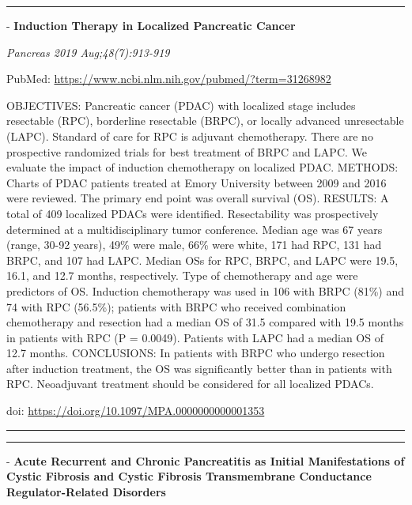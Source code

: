\documentclass[]{article}
\begin{document}
\begin{center}\rule{0.5\linewidth}{\linethickness}\end{center}

 - \textbf{Induction Therapy in Localized Pancreatic Cancer}

\emph{Pancreas 2019 Aug;48(7):913-919}

PubMed: \url{https://www.ncbi.nlm.nih.gov/pubmed/?term=31268982}

OBJECTIVES: Pancreatic cancer (PDAC) with localized stage includes
resectable (RPC), borderline resectable (BRPC), or locally advanced
unresectable (LAPC). Standard of care for RPC is adjuvant chemotherapy.
There are no prospective randomized trials for best treatment of BRPC
and LAPC. We evaluate the impact of induction chemotherapy on localized
PDAC. METHODS: Charts of PDAC patients treated at Emory University
between 2009 and 2016 were reviewed. The primary end point was overall
survival (OS). RESULTS: A total of 409 localized PDACs were identified.
Resectability was prospectively determined at a multidisciplinary tumor
conference. Median age was 67 years (range, 30-92 years), 49\% were
male, 66\% were white, 171 had RPC, 131 had BRPC, and 107 had LAPC.
Median OSs for RPC, BRPC, and LAPC were 19.5, 16.1, and 12.7 months,
respectively. Type of chemotherapy and age were predictors of OS.
Induction chemotherapy was used in 106 with BRPC (81\%) and 74 with RPC
(56.5\%); patients with BRPC who received combination chemotherapy and
resection had a median OS of 31.5 compared with 19.5 months in patients
with RPC (P = 0.0049). Patients with LAPC had a median OS of 12.7
months. CONCLUSIONS: In patients with BRPC who undergo resection after
induction treatment, the OS was significantly better than in patients
with RPC. Neoadjuvant treatment should be considered for all localized
PDACs.

doi: \url{https://doi.org/10.1097/MPA.0000000000001353}

{}

{}

\begin{center}\rule{0.5\linewidth}{\linethickness}\end{center}

\begin{center}\rule{0.5\linewidth}{\linethickness}\end{center}

 - \textbf{Acute Recurrent and Chronic Pancreatitis as Initial
Manifestations of Cystic Fibrosis and Cystic Fibrosis Transmembrane
Conductance Regulator-Related Disorders}
\end{document}
